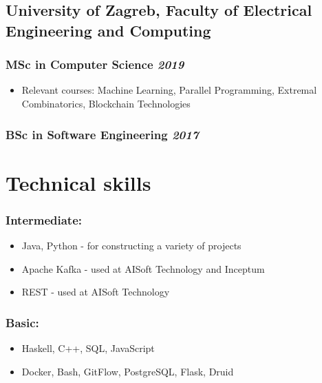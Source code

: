 \documentclass[a4paper]{article}
\newcommand{\bolditalicpair}
[2]
{\textbf{#1} \texorpdfstring{\hfill}{} \textit{#2}}
\begin{document}
\subsection{\bolditalicpair{University of Zagreb, Faculty of Electrical Engineering and Computing}{}}

\subsubsection{\bolditalicpair{MSc in Computer Science}{2019}}

\begin{itemize}
  \item Relevant courses: Machine Learning, Parallel Programming, Extremal Combinatorics, Blockchain Technologies %
\end{itemize}

\subsubsection{\bolditalicpair{BSc in Software Engineering}{2017}}



\section{Technical skills}
\subsubsection{\bolditalicpair{Intermediate:}{}}

\begin{itemize}
  \item Java, Python - for constructing a variety of projects
  \item Apache Kafka - used at AISoft Technology and Inceptum
  \item REST - used at AISoft Technology
\end{itemize}

\subsubsection{\bolditalicpair{Basic:}{}}

\begin{itemize}
  \item Haskell, C++, SQL, JavaScript
  \item Docker, Bash, GitFlow, PostgreSQL, Flask, Druid
\end{itemize}
\end{document}
